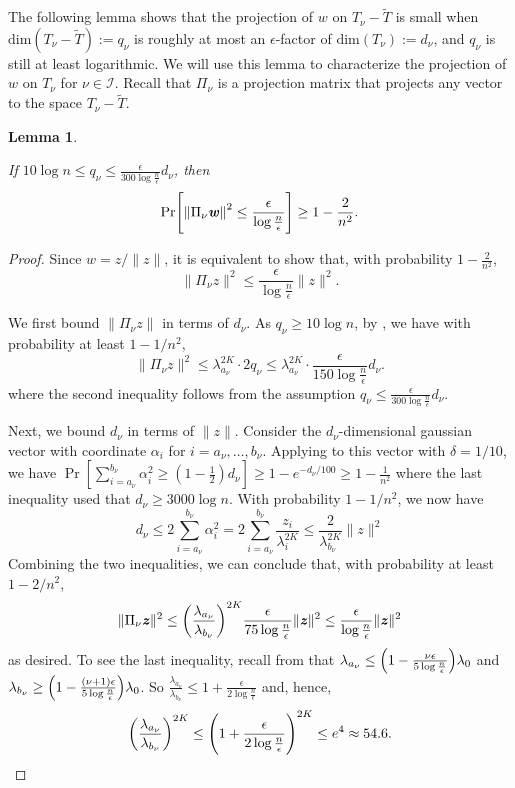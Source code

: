 \documentclass[11pt]{article}
\newtheorem{lemma}[theorem]{Lemma}
\renewcommand{\norm}[1]{\ensuremath{\left\lVert #1 \right\rVert}}
\let\originalleft\left
\let\originalright\right
\renewcommand{\left}{\mathopen{}\mathclose\bgroup\originalleft}
\renewcommand{\right}{\aftergroup\egroup\originalright}
\def\dim#1{\mathrm{dim} (#1)}
\newcommand\ww{\boldsymbol{\mathit{w}}}
\newcommand\zz{\boldsymbol{\mathit{z}}}
\newcommand\Ttil{{\tilde{\mathit{T}}}}
\begin{document}
The following lemma shows that the projection of $\ww$ on $T_{\nu}-\Ttil$ is small when $\dim{T_\nu - \Ttil}:= q_\nu$ is roughly at most an $\epsilon$-factor of $\dim{T_\nu}:= d_\nu$, and $q_\nu$ is still at least logarithmic.
We will use this lemma to characterize the projection of $\ww$ on $T_{\nu}$ for $\nu \in \mathcal{I}$. 
Recall that $\Pi_\nu$ is a projection matrix that projects any vector to the space $T_{\nu}-\Ttil$.
\begin{lemma}\label{lem:GaussianProjD}

If $ 10 \log n \leq q_{\nu} \leq \frac{\epsilon}{300\log\frac{n}{\epsilon}}d_{\nu}$, then
\[
\Pr\left[\norm{\Pi_{\nu}\ww}^2 \leq \frac{\epsilon}{\log\frac{n}{\epsilon}} \right] \geq 1-\frac{2}{n^{2}}.
\]
\end{lemma}
\begin{proof}
Since $\ww=\zz/\|\zz\|$, it is equivalent to show that, with probability $1-\frac{2}{n^{2}}$, $$\|\Pi_{\nu}\zz\|^{2}\leq\frac{\epsilon}{\log\frac{n}{\epsilon}}\|\zz\|^{2}.$$ 

We first bound $\|\Pi_\nu \zz\|$ in terms of $d_\nu$. As $q_{\nu} \ge 10\log n$, by , we have with probability at least $1-1/n^{2}$, 
\[
\|\Pi_{\nu}\zz\|^{2}\leq\lambda_{a_{\nu}}^{2K}\cdot2q_{\nu}\le\lambda_{a_{\nu}}^{2K}\cdot\frac{\epsilon}{150\log\frac{n}{\epsilon}}d_{\nu}.
\]
where the second inequality follows from the assumption $q_{\nu}\leq\frac{\epsilon}{300\log\frac{n}{\epsilon}}d_{\nu}$. 

Next, we bound $d_{\nu}$ in terms of $\|z\|$. Consider the $d_{\nu}$-dimensional gaussian vector with coordinate $\alpha_{i}$ for $i=a_{\nu},\dots,b_{\nu}$. Applying  to this vector with $\delta=1/10$, we have $\Pr[\sum_{i=a_{\nu}}^{b_{\nu}}\alpha_{i}^{2}\geq (1-\frac{1}{2})d_{\nu}]\geq1-e^{-d_{\nu}/100}\geq1-\frac{1}{n^{2}}$ where the last inequality used that $d_{\nu}\ge 3000\log n$. With probability $1-1/n^{2}$, we now have
\[
d_{\nu}\le2\sum_{i=a_{\nu}}^{b_{\nu}}\alpha_{i}^{2}=2\sum_{i=a_{\nu}}^{b_{\nu}}\frac{z_{i}}{\lambda_{i}^{2K}}\le\frac{2}{\lambda_{b_{\nu}}^{2K}}\|\zz\|^{2}
\]
Combining the two inequalities, we can conclude that, with probability at least $1-2/n^{2}$, 
\[
\|\Pi_{\nu}\zz\|^{2}\le\left(\frac{\lambda_{a_{\nu}}}{\lambda_{b_{\nu}}}\right)^{2K}\frac{\epsilon}{75\log\frac{n}{\epsilon}}\|\zz\|^{2}\le\frac{\epsilon}{\log\frac{n}{\epsilon}}\|\zz\|^{2}
\]
as desired. To see the last inequality, recall from  that $\lambda_{a_{\nu}}\leq\left(1-\frac{\nu\epsilon}{5\log\frac{n}{\epsilon}}\right)\lambda_{0}$ and $\lambda_{b_{\nu}}\geq\left(1-\frac{(\nu+1)\epsilon}{5\log\frac{n}{\epsilon}}\right)\lambda_{0}$. So $\frac{\lambda_{a_{\nu}}}{\lambda_{b_{\nu}}}\le1+\frac{\epsilon}{2\log\frac{n}{\epsilon}}$ and, hence, 
\[
\left(\frac{\lambda_{a_{\nu}}}{\lambda_{b_{\nu}}}\right)^{2K}\leq\left(1+\frac{\epsilon}{2\log\frac{n}{\epsilon}}\right)^{2K}\le e^{4}\approx54.6. \qedhere
\]
\end{proof}
\end{document}
